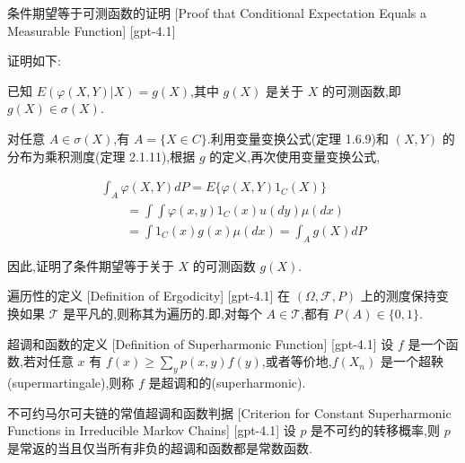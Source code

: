 \documentclass[UTF8]{ctexart}
\begin{document}
    
    
    \begin{prf}
        {条件期望等于可测函数的证明}
        [Proof that Conditional Expectation Equals a Measurable Function]
        [gpt-4.1]
        
证明如下:

已知 $E ( \varphi ( X , Y ) | X ) = g ( X )$,其中 $g(X)$ 是关于 $X$ 的可测函数,即 $g ( X ) \in \sigma ( X )$.

对任意 $A \in \sigma ( X )$,有 $A = \{ X \in C \}$.利用变量变换公式(定理 1.6.9)和 $(X, Y)$ 的分布为乘积测度(定理 2.1.11),根据 $g$ 的定义,再次使用变量变换公式,

\[
\begin{array}{l}
\displaystyle \int_{A} \varphi(X, Y) dP = E\{ \varphi(X, Y) 1_{C}(X) \} \\
\displaystyle \qquad = \int \int \varphi(x, y) 1_{C}(x) 
u(dy) \mu(dx) \\
\displaystyle \qquad = \int 1_{C}(x) g(x) \mu(dx) = \int_{A} g(X) dP
\end{array}
\]

因此,证明了条件期望等于关于 $X$ 的可测函数 $g(X)$.

    \end{prf}
    
    
    
    \begin{dfn}
        {遍历性的定义}
        [Definition of Ergodicity]
        [gpt-4.1]
        在 $(\Omega, \mathcal{F}, P)$ 上的测度保持变换如果 $\mathcal{T}$ 是平凡的,则称其为遍历的.即,对每个 $A \in \mathcal{T}$,都有 $P(A) \in \{0, 1\}$.
    \end{dfn}
    
    
    
    \begin{dfn}
        {超调和函数的定义}
        [Definition of Superharmonic Function]
        [gpt-4.1]
        设 $f$ 是一个函数,若对任意 $x$ 有 $f(x) \geq \sum_{y} p(x, y) f(y)$,或者等价地,$f(X_n)$ 是一个超鞅(supermartingale),则称 $f$ 是超调和的(superharmonic).
    \end{dfn}
    
    
    
    \begin{thm}
        {不可约马尔可夫链的常值超调和函数判据}
        [Criterion for Constant Superharmonic Functions in Irreducible Markov Chains]
        [gpt-4.1]
        设 $p$ 是不可约的转移概率,则 $p$ 是常返的当且仅当所有非负的超调和函数都是常数函数.
    \end{thm}
    
\end{document}
